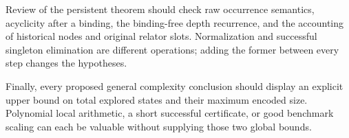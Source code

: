 \documentclass[11pt,a4paper]{article}
\theoremstyle{definition}
\theoremstyle{remark}
\begin{document}
Review of the persistent theorem should check raw occurrence semantics,
acyclicity after a binding, the binding-free depth recurrence, and the
accounting of historical nodes and original relator slots. Normalization
and successful singleton elimination are different operations; adding
the former between every step changes the hypotheses.

Finally, every proposed general complexity conclusion should display an
explicit upper bound on total explored states and their maximum encoded
size. Polynomial local arithmetic, a short successful certificate, or
good benchmark scaling can each be valuable without supplying those two
global bounds.

\clearpage
{}
{}


\end{document}
